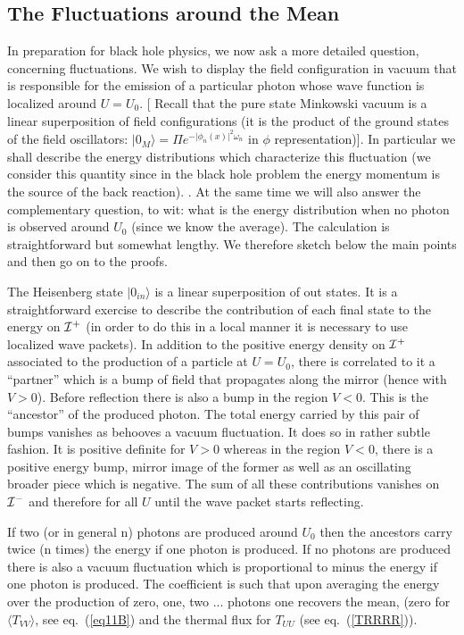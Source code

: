 \documentclass[12pt,oneside]{report}
\def\ket#1{|#1\rangle}
\begin{document}
\subsection{The Fluctuations around the Mean}\label{fluctmirr}

In preparation for black hole physics, we now ask a more detailed question,
concerning fluctuations.  We wish to display the field configuration in vacuum
that is responsible for the emission of a particular photon whose wave function is
localized around $U=U_0$. [ Recall that the
pure state Minkowski vacuum is a linear superposition of field configurations
(it is the product of the ground states of the field oscillators: $\ket{0_M} =
\Pi e^{-\vert \phi_n(x) \vert^2 \omega_n}$ 
in $\phi$ representation)]. In particular we shall describe the energy
distributions which characterize this fluctuation (we consider this
quantity since in the black hole problem the energy momentum is the
source of the back reaction). .
At the same time we will also answer the complementary
question, to wit: what is the energy distribution when no photon is observed
around $U_0$ (since we know the average). The calculation is straightforward
but somewhat lengthy. We therefore sketch below the main points and then go on
to the proofs. 

The Heisenberg state $\ket{0_{in}}$ is a linear superposition of out
states. It is a straightforward exercise to describe the contribution
of each final state to the energy on ${\cal I}^+$  (in order to do this
in a local manner it is necessary to use localized wave packets). In
addition to the positive energy density on ${\cal I}^+$ associated to
the production of a particle at $U=U_0$, there is
 correlated to it a
``partner'' which is a bump of field that propagates along the
mirror (hence with $V>0$).
Before reflection
there is also a bump  in the region $V<0$.
This is the ``ancestor'' of the produced 
photon. The total energy carried by this
pair of bumps vanishes as behooves a vacuum fluctuation. It does so in rather
subtle fashion. It is positive definite for $V>0$ whereas in the region $V<0$,
there is a positive energy bump, mirror image of the former as well as an
oscillating broader  piece which is negative. The sum of all these contributions
vanishes on $\cal{I}^-$ and therefore for all $U$
 until the wave packet starts reflecting. 

If two (or in general n) photons are produced around $U_0$ then the ancestors
carry twice (n times) the energy if one photon is produced. If no photons are
produced there is also a vacuum fluctuation which is proportional to minus
 the energy if one photon is produced. The coefficient is such that  upon
averaging the energy over the production of zero, one, two ... photons one
recovers the mean, 
(zero for $\langle T_{VV}\rangle$, see eq.~(\ref{eq11B}) and the
thermal flux for $T_{UU}$ (see eq.~(\ref{TRRRR})).
\end{document}
